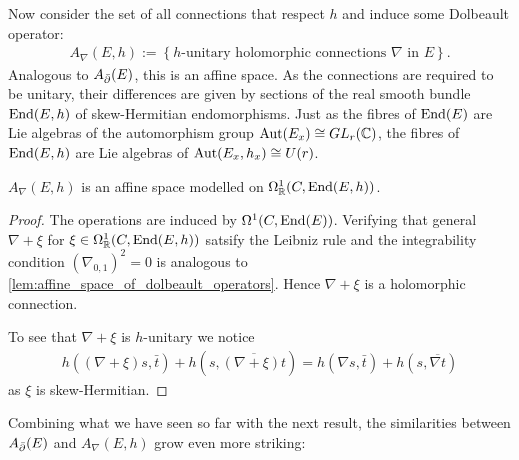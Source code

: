 \documentclass[12pt]{ociamthesis}  %
\begin{document}
Now consider the set of all connections that respect $h$ and induce
some Dolbeault operator:
\begin{align*}
  A_\nabla(E,h) := \left\lbrace{\text{$h$-unitary holomorphic connections $\nabla$ in $E$}}\right\rbrace.
\end{align*}
Analogous to $A_{\bar{\partial}} (E)$, this is an affine space.
As the connections are required to be unitary, their differences
are given by sections of the real smooth bundle $\operatorname{End}(E,h)$ of
skew-Hermitian endomorphisms. Just as the fibres of $\operatorname{End}(E)$
are Lie algebras of the automorphism group $\operatorname{Aut}(E_x)\cong GL_r(\mathbb C)$,
the fibres of $\operatorname{End}(E,h)$ are Lie algebras of $\operatorname{Aut}(E_x,h_x)\cong U(r)$.

\begin{lemma}
  $A_\nabla(E,h)$ is an affine space modelled on
  $\Omega^1_{\mathbb{R}}(C,\operatorname{End}(E,h))$.
  \begin{proof}
    The operations are induced by $\Omega^1(C,\operatorname{End}(E))$.
    Verifying that general $\nabla + \xi$ for
    $\xi\in\Omega^1_{\mathbb{R}}(C,\operatorname{End}(E,h))$
    satsify the Leibniz rule and the integrability
    condition $(\nabla_{0,1})^2=0$ is analogous to
    \ref{lem:affine_space_of_dolbeault_operators}. Hence $\nabla + \xi$
    is a holomorphic connection.

    To see that $\nabla + \xi$ is $h$-unitary we notice
    \begin{align*}
      h((\nabla + \xi)s, \bar t) + h(s,\overline{(\nabla + \xi)t})
      =  h(\nabla s, \bar t) + h(s,\overline{\nabla t})
    \end{align*}
    as $\xi$ is skew-Hermitian.
  \end{proof}
\end{lemma}

Combining what we have seen so far with the next result, the
similarities between $A_{\bar{\partial}} (E)$ and $A_\nabla(E,h)$ grow even more
striking:
\end{document}
